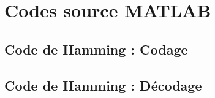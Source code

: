 \documentclass[a4paper, 12pt]{article}
\newcommand{\FSource}[1]{%

}
\begin{document}
\clearpage

%
%
\appendix

\section{Codes source MATLAB}

\subsection{Code de Hamming : Codage}\label{hamcode}

\FSource{../hamcode.m}

\newpage

\subsection{Code de Hamming : Décodage}\label{hamdecode}

\FSource{../hamdecode.m}
\end{document}
